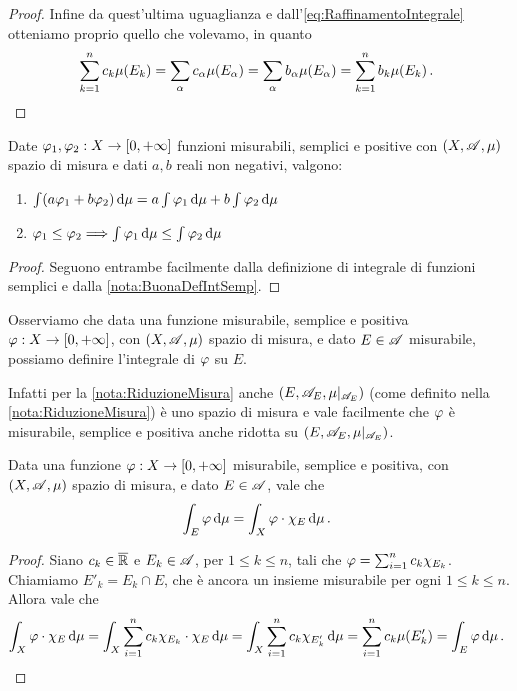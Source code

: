 \begin{proof}
	Infine da quest'ultima uguaglianza e dall'\cref{eq:RaffinamentoIntegrale} otteniamo proprio quello che volevamo, in quanto
	\begin{equation*}
		\sum_{k=1}^n c_k \mu(E_k)=\sum_\alpha c_\alpha\mu(E_\alpha)=\sum_\alpha b_\alpha\mu(E_\alpha)=\sum_{k=1}^n b_k \mu(E_k)\, \text{. }
	\end{equation*}
\end{proof}

\begin{proposition}\label{prop:IntegraleSemplici}
	Date $\varphi_1,\varphi_2:X\to[0,+\infty]$ funzioni misurabili, semplici e positive con $(X,\mathscr A,\mu)$ spazio di misura e dati $a,b$ reali non negativi, valgono:
	\begin{enumerate}
		\item $\int (a\varphi_1+b\varphi_2)\,\mathrm d\mu=a\int \varphi_1\,\mathrm d\mu+b\int \varphi_2\,\mathrm d\mu$ \label{PIS:add}
		\item $\varphi_1\le \varphi_2\Longrightarrow \int \varphi_1\,\mathrm d\mu\le \int \varphi_2\,\mathrm d\mu$ \label{PIS:mono}
	\end{enumerate}
\end{proposition}
\begin{proof}
	Seguono entrambe facilmente dalla definizione di integrale di funzioni semplici e dalla \cref{nota:BuonaDefIntSemp}.
\end{proof}

\begin{remark}
	Osserviamo che data una funzione misurabile, semplice e positiva $\varphi:X\to[0,+\infty]$, con $(X,\mathscr A,\mu)$ spazio di misura, e dato $E\in\mathscr A$ misurabile, possiamo definire l'integrale di $\varphi$ su $E$. 
	
	Infatti per la \cref{nota:RiduzioneMisura} anche $(E,\mathscr A_E,\mu|_{\mathscr A_E})$ (come definito nella \cref{nota:RiduzioneMisura}) è uno spazio di misura e vale facilmente che $\varphi$ è misurabile, semplice e positiva anche ridotta su $(E,\mathscr A_E,\mu|_{\mathscr A_E})$.
\end{remark}

\begin{proposition}\label{prop:IntegraleSempliciSuMisurabili}
	Data una funzione $\varphi:X\to[0,+\infty]$ misurabile, semplice e positiva, con $(X,\mathscr A,\mu)$ spazio di misura, e dato $E\in\mathscr A$, vale che
	\begin{equation*}
		\int_E \varphi\,\mathrm d\mu=\int_X \varphi \cdot \chi_E \,\mathrm d\mu\, \text{. }
	\end{equation*}
\end{proposition}
\begin{proof}
	Siano $c_k\in\overline{\mathbb R}$ e $E_k\in\mathscr A$, per $1\le k\le n$, tali che $\varphi=\sum_{i=1}^nc_k\chi_{E_k}$. Chiamiamo $E'_k=E_k\cap E$, che è ancora un insieme misurabile per ogni $1\le k\le n$. Allora vale che
	\begin{equation*}
		\int_X \varphi \cdot \chi_E \,\mathrm d\mu=\int_X \sum_{i=1}^nc_k\chi_{E_k}\cdot \chi_E \,\mathrm d\mu=\int_X \sum_{i=1}^nc_k\chi_{E'_k} \,\mathrm d\mu = \sum_{i=1}^n c_k \mu(E'_k)=\int_E \varphi\,\mathrm d\mu \, \text{. }
	\end{equation*}
\end{proof}

